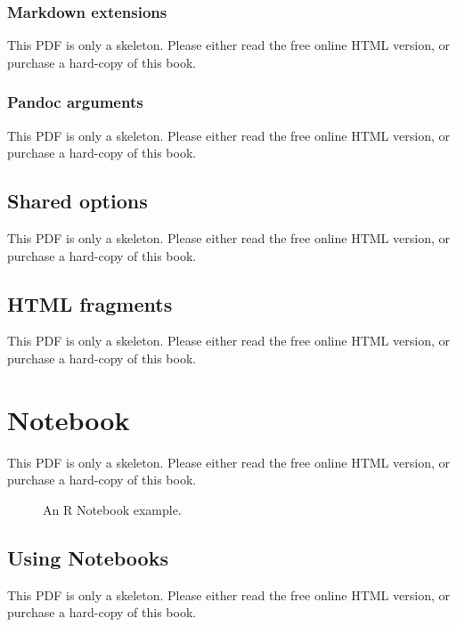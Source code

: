 \documentclass[
  11pt,
]{krantz}
\theoremstyle{definition}
\theoremstyle{definition}
\theoremstyle{definition}
\theoremstyle{definition}
\theoremstyle{remark}
\begin{document}
\subsubsection{Markdown extensions}\label{markdown-extensions}

This PDF is only a skeleton. Please either read the free online HTML version, or purchase a hard-copy of this book.

\subsubsection{Pandoc arguments}\label{pandoc-arguments}

This PDF is only a skeleton. Please either read the free online HTML version, or purchase a hard-copy of this book.

\subsection{Shared options}\label{shared-options}

This PDF is only a skeleton. Please either read the free online HTML version, or purchase a hard-copy of this book.

\subsection{HTML fragments}\label{html-fragments}

This PDF is only a skeleton. Please either read the free online HTML version, or purchase a hard-copy of this book.

\section{Notebook}\label{notebook}

This PDF is only a skeleton. Please either read the free online HTML version, or purchase a hard-copy of this book.

\begin{figure}\caption{An R Notebook example.}\end{figure}

\subsection{Using Notebooks}\label{using-notebooks}

This PDF is only a skeleton. Please either read the free online HTML version, or purchase a hard-copy of this book.
\end{document}
